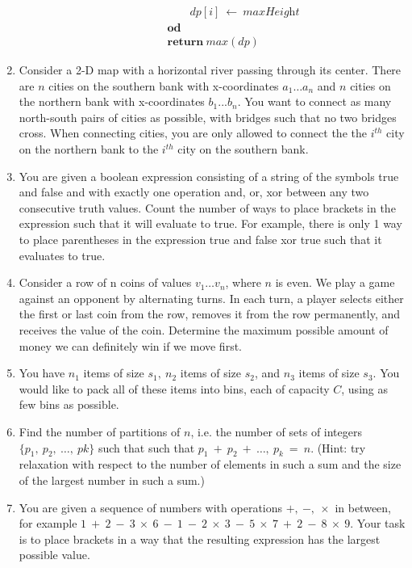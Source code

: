 \documentclass[a4paper]{article}
\begin{document}
\begin{enumerate}
\begin{description}
\begin{align*}
												&\qquad dp[i]\ \gets\ \textit{maxHeight} \\
												&\textbf{od} \\
												&\textbf{return}\ \textit{max}(dp)
										\end{align*}
						\end{description}
						\clearpage
				\item Consider a 2-D map with a horizontal river passing through its center. There are $n$ cities on the southern bank with x-coordinates $a_1 \dots a_n$ and $n$ cities on the northern bank with x-coordinates $b_1 . . . b_n$. You want to connect as many north-south pairs of cities as possible, with bridges such that no two bridges cross. When connecting cities, you are only allowed to connect the the $i^{th}$ city on the northern bank to the $i^{th}$ city on the southern bank.

				\item You are given a boolean expression consisting of a string of the symbols true and false and with exactly one operation and, or, xor between any two consecutive truth values. Count the number of ways to place brackets in the expression such that it will evaluate to true. For example, there is only 1 way to place parentheses in the expression true and false xor true such that it evaluates to true.

				\item Consider a row of n coins of values $v_1 \dots v_n$, where $n$ is even. We play a game against an opponent by alternating turns. In each turn, a player selects either the first or last coin from the row, removes it from the row permanently, and receives the value of the coin. Determine the maximum possible amount of money we can definitely win if we move first.

				\item You have $n_1$ items of size $s_1,\ n_2$ items of size $s_2$, and $n_3$ items of size $s_3$. You would like to pack all of these items into bins, each of capacity $C$, using as few bins as possible.

				\item Find the number of partitions of $n$, i.e. the number of sets of integers $\{p_1,\ p_2,\ \dots ,\ pk\}$ such that such that $p_1\ +\ p_2\ +\ \dots ,\ p_k\ =\ n$. (Hint: try relaxation with respect to the number of elements in such a sum and the size of the largest number in such a sum.)
				\item You are given a sequence of numbers with operations $+,\ -,\ \times$ in between, for example $1\ +\ 2\ -\ 3\ \times\ 6\ -\ 1\ -\ 2\ \times\ 3\ -\ 5\ \times\ 7\ +\ 2\ -\ 8\ \times\ 9$. Your task is to place brackets in a way that the resulting expression has the largest possible value.


\end{enumerate}
\end{document}
